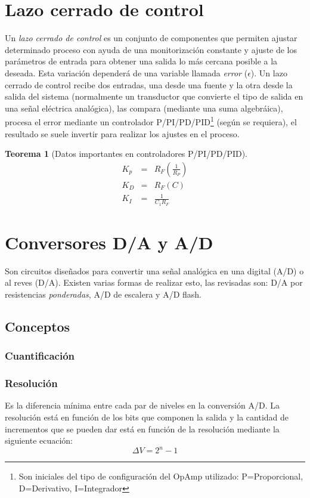 \documentclass[12pt,spanish,lettersize]{report}
\newtheorem{teo}{Teorema}[section]
\begin{document}
\section{Lazo cerrado de control}
Un \emph{lazo cerrado de control} es un conjunto de componentes que permiten ajustar determinado proceso con ayuda de una monitorizaci\'on constante y ajuste de los par\'ametros de entrada para obtener una salida lo m\'as cercana posible a la deseada. Esta variaci\'on depender\'a de una variable llamada \emph{error} ($\epsilon$).
Un lazo cerrado de control recibe dos entradas, una desde una fuente y la otra desde la salida del sistema (normalmente un transductor que convierte el tipo de salida en una se\~nal el\'ectrica anal\'ogica), las compara (mediante una suma algebr\'aica), procesa el error mediante un controlador P/PI/PD/PID\footnote{Son iniciales del tipo de configuraci\'on del OpAmp utilizado: P=Proporcional, D=Derivativo, I=Integrador} (seg\'un se requiera), el resultado se suele invertir para realizar los ajustes en el proceso.
\begin{teo}[Datos importantes en controladores P/PI/PD/PID]
\begin{eqnarray}
K_p&=&R_F(\frac{1}{R_P})\\
K_D&=&R_F(C)\\
K_I&=&\frac{1}{C_1R_F}
\end{eqnarray}
\end{teo}
\section{Conversores D/A y A/D}
Son circuitos dise\~nados para convertir una se\~nal anal\'ogica en una digital (A/D) o al reves (D/A). Existen varias formas de realizar esto, las revisadas son: D/A por resistencias \emph{ponderadas}, A/D de escalera y A/D flash.
\subsection{Conceptos}
\subsubsection{Cuantificaci\'on}
\subsubsection{Resoluci\'on}
Es la diferencia m\'inima entre cada par de niveles en la conversi\'on A/D. La resoluci\'on est\'a en funci\'on de los bits que componen la salida y la cantidad de incrementos que se pueden dar est\'a en funci\'on de la resoluci\'on mediante la siguiente ecuaci\'on:
\begin{equation}
\Delta V=2^n-1
\end{equation}
\end{document}
